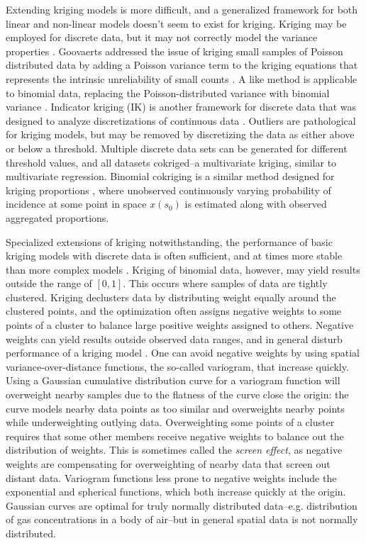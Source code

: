 \documentclass[draft]{article}
\begin{document}
Extending kriging models is more difficult, and a generalized framework for both linear and non-linear models doesn't seem to exist for kriging.  Kriging may be employed for discrete data, but it may not correctly model the variance properties \cite{goovaerts10}.  Goovaerts addressed the issue of kriging small samples of Poisson distributed data by adding a Poisson variance term to the kriging equations that represents the intrinsic unreliability of small counts \cite{goovaerts06}.  A like method is applicable to binomial data, replacing the Poisson-distributed variance with binomial variance \cite{goovaerts04, goovaerts09}.  Indicator  kriging (IK) is another framework for discrete data that was designed to analyze discretizations of continuous data \cite{journel83}.  Outliers are pathological for kriging models, but may be removed by discretizing the data as either above or below a threshold.  Multiple discrete data sets can be generated for different threshold values, and all datasets cokriged--a multivariate kriging, similar to multivariate regression.  Binomial cokriging is a similar method designed for kriging proportions \cite{lajaunie91, oliver98}, where unobserved continuously varying probability of incidence at some point in space $x(s_0)$ is estimated along with observed aggregated proportions.

Specialized extensions of kriging notwithstanding, the performance of basic kriging models with discrete data is often sufficient, and at times more stable than more complex models \cite{oliver98}.  Kriging of binomial data, however, may yield results outside the range of $[0, 1]$.  This occurs where samples of data are tightly clustered.  Kriging declusters data by distributing weight equally around the clustered points, and the optimization often assigns negative weights to some points of a cluster to balance large positive weights assigned to others.  Negative weights can yield results outside observed data ranges, and in general disturb performance of a kriging model \cite{duetsch96}.  One can avoid negative weights by using spatial variance-over-distance functions, the so-called variogram, that increase quickly.  Using a Gaussian cumulative distribution curve for a variogram function will overweight nearby samples due to the flatness of the curve close the origin: the curve models nearby data points as too similar and overweights nearby points while underweighting outlying data.  Overweighting some points of a cluster requires that some other members receive negative weights to balance out the distribution of weights.  This is sometimes called the {\em screen effect}, as negative weights are compensating for overweighting of nearby data that screen out distant data.  Variogram functions less prone to negative weights include the exponential and spherical functions, which both increase quickly at the origin.  Gaussian curves are optimal for truly normally distributed data--e.g. distribution of gas concentrations in a body of air--but in general spatial data is not normally distributed.
\end{document}
